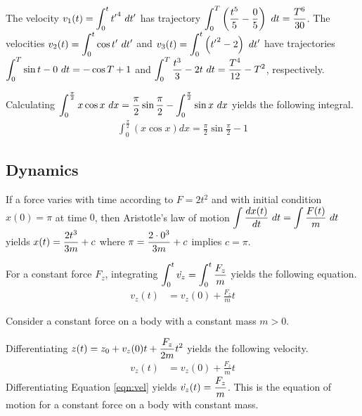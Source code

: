 \begin{answer}
	The velocity $\displaystyle v_1(t) = \int_0^t {t'}^4~dt'$ has trajectory $\displaystyle \int_0^T \left(\frac{t^5}{5} - \frac{0}{5}\right) ~dt = \frac{T^6}{30}$.
	The velocities $\displaystyle v_2(t) = \int_0^t \cos t' ~dt'$ and $\displaystyle v_3(t) = \int_0^t \left({t'}^2-2\right) ~dt'$ have trajectories $\displaystyle \int_0^T \sin t - 0 ~dt = - \cos T + 1$ and $\displaystyle \int_0^T \frac{t^3}{3}-2t ~dt = \frac{T^4}{12}-T^2$, respectively.
\end{answer}

\begin{answer}
	Calculating $\displaystyle \int_0^{\frac{\pi}{2}} x \cos x ~dx = \frac{\pi}{2} \sin \frac{\pi}{2} - \int_0^{\frac{\pi}{2}} \sin x ~dx$ yields the following integral.
	\begin{align}
		\int_0^{\frac{\pi}{2}} \left(x \cos x\right) dx = \frac{\pi}{2} \sin \frac{\pi}{2} - 1
	\end{align}
\end{answer}

\subsection{Dynamics}

\begin{answer}
	If a force varies with time according to $F = 2t^2$ and with initial condition $x(0) = \pi$ at time $0$, then Aristotle's law of motion $\displaystyle \int \frac{d x(t)}{dt}~dt = \int \frac{F(t)}{m}~dt$ yields $\displaystyle x(t) = \frac{2t^3}{3m} + c$ where $\displaystyle \pi = \frac{2\cdot 0^3}{3m} + c$ implies $c = \pi$.
\end{answer}

\begin{answer}
	For a constant force $F_z$, integrating $\displaystyle \int_0^t \dot{v_z} = \int_0^t \frac{F_z}{m}$ yields the following equation.
	\begin{align}
		v_z(t) & = v_z(0) + \frac{F_z}{m}t
	\end{align}
\end{answer}

\begin{answer}
	Consider a constant force on a body with a constant mass $m > 0$.

	Differentiating $\displaystyle z(t) = z_0 + v_z(0)t + \frac{F_z}{2m}t^2$ yields the following velocity.
	\begin{align}\label{eqn:vel}
		v_z(t) & = v_z(0) + \frac{F_z}{m}t
	\end{align}
	Differentiating Equation \eqref{eqn:vel} yields $\displaystyle \dot{v_z}(t) = \frac{F_z}{m}$.
	This is the equation of motion for a constant force on a body with constant mass.
\end{answer}

